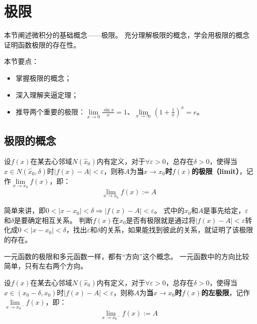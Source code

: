 \section{极限}

本节阐述微积分的基础概念——极限。
充分理解极限的概念，学会用极限的概念证明函数极限的存在性。

本节要点：
\begin{itemize}
    \item 掌握极限的概念；
    \item 深入理解夹逼定理；
    \item 推导两个重要的极限：$\underset{x\rightarrow 0}{\lim}\frac{\sin x}{x}=1$、$\underset{x\rightarrow \infty}{\lim}\left( 1+\frac{1}{x} \right) ^x=e$。
\end{itemize}

\subsection{极限的概念}

\begin{definition}[极限]
设$f\left( x \right) $在某去心邻域$N\left( \hat{x}_0 \right) $内有定义，对于$\forall \varepsilon >0$，总存在$\delta >0$，使得当$x\in N\left( \hat{x}_0,\delta \right) $时$\left| f\left( x \right) -A \right|<\varepsilon $，则称$A$为{\bf 当$x\rightarrow x_0$时$f\left( x \right) $的极限（limit）}，记作$\underset{x\rightarrow x_0}{\lim}f\left( x \right) $，即：
\[
\underset{x\rightarrow x_0}{\lim}f\left( x \right) :=A
\]
\end{definition}

简单来讲，即$0<\left| x-x_0 \right|<\delta \Rightarrow \left| f\left( x \right) -A \right|<\varepsilon $。
式中的$x_0$和$A$是事先给定，$\varepsilon $和$\delta $是要确定相互关系。
判断$f\left( x \right) $在$x_0$是否有极限就是通过将$\left| f\left( x \right) -A \right|<\varepsilon $转化成$0<\left| x-x_0 \right|<\delta $，找出$\varepsilon $和$\delta $的关系，如果能找到彼此的关系，就证明了该极限的存在。

\begin{tcolorbox}
一元函数的极限和多元函数一样，都有“方向”这个概念。
一元函数中的方向比较简单，只有左右两个方向。
\end{tcolorbox}

\begin{definition}[左极限]
设$f\left( x \right) $在某去心邻域$N\left( \hat{x}_0 \right) $内有定义，对于$\forall \varepsilon >0$，总存在$\delta >0$，使得当$x\in \left( x_0-\delta ,x_0 \right) $时$\left| f\left( x \right) -A \right|<\varepsilon $，则称$A$为{\bf 当$x\rightarrow x_0$时$f\left( x \right) $的左极限}，记作$\underset{x\rightarrow {x_0}^-}{\lim}f\left( x \right) $，即：
\[
\underset{x\rightarrow {x_0}^-}{\lim}f\left( x \right) :=A
\]
\end{definition}

